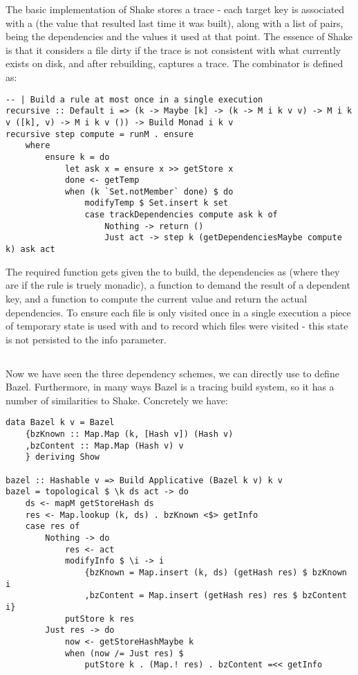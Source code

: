 The basic implementation of Shake stores a trace - each target key is associated with a  (the value that resulted last time it was built), along with a list of  pairs, being the dependencies and the values it used at that point. The essence of Shake is that it considers a file dirty if the trace is not consistent with what currently exists on disk, and after rebuilding, captures a trace. The  combinator is defined as:

\begin{verbatim}
-- | Build a rule at most once in a single execution
recursive :: Default i => (k -> Maybe [k] -> (k -> M i k v v) -> M i k v ([k], v) -> M i k v ()) -> Build Monad i k v
recursive step compute = runM . ensure
    where
        ensure k = do
            let ask x = ensure x >> getStore x
            done <- getTemp
            when (k `Set.notMember` done) $ do
                modifyTemp $ Set.insert k set
                case trackDependencies compute ask k of
                    Nothing -> return ()
                    Just act -> step k (getDependenciesMaybe compute k) ask act
\end{verbatim}

The required  function gets given the  to build, the dependencies as  (where they are  if the rule is truely monadic), a function to demand the result of a dependent key, and a function to compute the current value and return the actual dependencies. To ensure each file is only visited once in a single execution a piece of temporary state is used with  and  to record which files were visited - this state is not persisted to the  info parameter.

\subsection{\Bazel}\label{sec-implementation-bazel}

Now we have seen the three dependency schemes, we can directly use  to define Bazel. Furthermore, in many ways Bazel is a tracing build system, so it has a number of similarities to Shake. Concretely we have:

\begin{verbatim}
data Bazel k v = Bazel
    {bzKnown :: Map.Map (k, [Hash v]) (Hash v)
    ,bzContent :: Map.Map (Hash v) v
    } deriving Show

bazel :: Hashable v => Build Applicative (Bazel k v) k v
bazel = topological $ \k ds act -> do
    ds <- mapM getStoreHash ds
    res <- Map.lookup (k, ds) . bzKnown <$> getInfo
    case res of
        Nothing -> do
            res <- act
            modifyInfo $ \i -> i
                {bzKnown = Map.insert (k, ds) (getHash res) $ bzKnown i
                ,bzContent = Map.insert (getHash res) res $ bzContent i}
            putStore k res
        Just res -> do
            now <- getStoreHashMaybe k
            when (now /= Just res) $
                putStore k . (Map.! res) . bzContent =<< getInfo
\end{verbatim}

